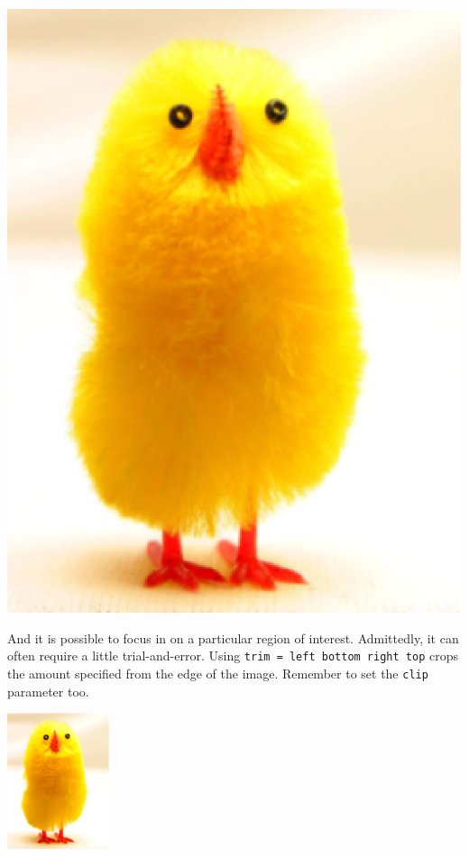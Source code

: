 \documentclass[english]{article}
\begin{document}
\begin{center}
  \includegraphics[scale=0.5, angle=180]{chick}
\end{center}

And it is possible to focus in on a particular region of interest.
Admittedly, it can often require a little trial-and-error. Using
\texttt{trim = left bottom right top} crops the amount specified from
the edge of the image.  Remember to set the \texttt{clip} parameter too.

\begin{center}
  \includegraphics[trim = 10mm 80mm 20mm 5mm, clip, width=3cm]{chick}
\end{center}
\end{document}
